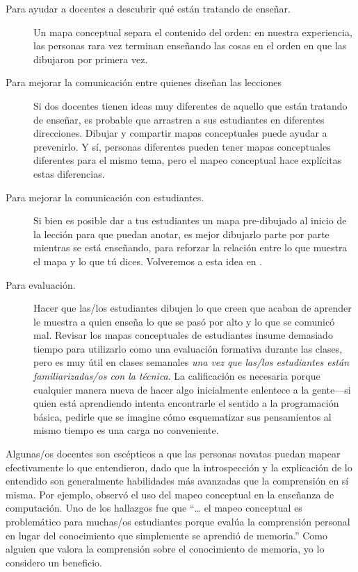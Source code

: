 \begin{description}

\item[Para ayudar a docentes a descubrir qué están tratando de enseñar.]
  Un mapa conceptual separa el contenido del orden:
  en nuestra experiencia,
  las personas rara vez terminan enseñando las cosas en el orden en que las dibujaron por primera vez.

\item[Para mejorar la comunicación entre quienes diseñan las lecciones]
  Si dos docentes tienen ideas muy diferentes de aquello que están tratando de enseñar, es probable que arrastren a sus estudiantes en diferentes direcciones.
  Dibujar y compartir mapas conceptuales puede ayudar a prevenirlo.
  Y sí,
  personas diferentes pueden tener mapas conceptuales diferentes para el mismo tema,
  pero el mapeo conceptual hace explícitas estas diferencias.

\item[Para mejorar la comunicación con estudiantes.]
  Si bien es posible dar a tus estudiantes un mapa pre-dibujado al inicio de la lección para que puedan anotar,
  es mejor dibujarlo parte por parte mientras se está enseñando,
  para reforzar la relación entre lo que muestra el mapa y lo que tú dices.
  Volveremos a esta idea en .

\item[Para evaluación.]
  Hacer que las/los estudiantes dibujen lo que creen que acaban de aprender
  le muestra a quien enseña lo que se pasó por alto y lo que se comunicó mal.
  Revisar los mapas conceptuales de estudiantes insume demasiado tiempo para utilizarlo como una evaluación formativa durante las clases,
  pero es muy útil en clases semanales \emph{una vez que las/los estudiantes están familiarizadas/os con la técnica}.
  La calificación es necesaria porque
  cualquier manera nueva de hacer algo inicialmente enlentece a la gente---si quien está aprendiendo intenta encontrarle el sentido a la programación básica,
  pedirle que se imagine cómo esquematizar sus pensamientos al mismo tiempo es una carga no conveniente.

\end{description}

Algunas/os docentes son escépticos a que las personas novatas puedan mapear efectivamente lo que entendieron,
dado que la introspección y la explicación de lo entendido son generalmente habilidades más avanzadas que la comprensión en sí misma.
Por ejemplo,
\cite{Kepp2008} observó el uso del mapeo conceptual en la enseñanza de computación.
Uno de los hallazgos fue que
``{\ldots} el mapeo conceptual es problemático para muchas/os estudiantes porque
evalúa la comprensión personal en lugar del conocimiento que simplemente se aprendió de memoria.''
Como alguien que valora la comprensión sobre el conocimiento de memoria, yo
lo considero un beneficio.

